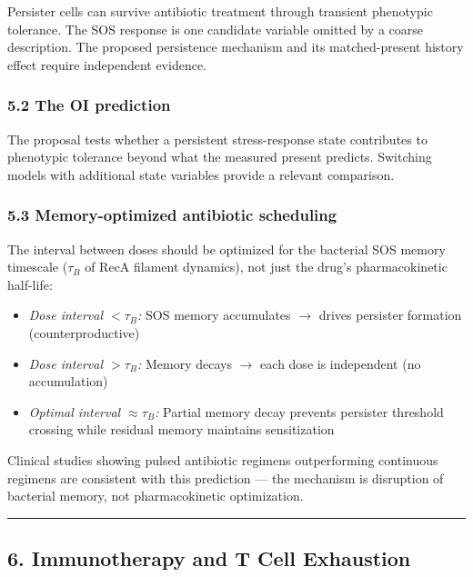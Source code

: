 \documentclass[
]{article}
\providecommand{\tightlist}{%
  \setlength{\itemsep}{0pt}\setlength{\parskip}{0pt}}
\begin{document}
Persister cells can survive antibiotic treatment through transient
phenotypic tolerance. The SOS response is one candidate variable omitted
by a coarse description. The proposed persistence mechanism and its
matched-present history effect require independent evidence.

\hypertarget{the-oi-prediction-1}{%
\subsubsection{5.2 The OI prediction}\label{the-oi-prediction-1}}

The proposal tests whether a persistent stress-response state
contributes to phenotypic tolerance beyond what the measured present
predicts. Switching models with additional state variables provide a
relevant comparison.

\hypertarget{memory-optimized-antibiotic-scheduling}{%
\subsubsection{5.3 Memory-optimized antibiotic
scheduling}\label{memory-optimized-antibiotic-scheduling}}

The interval between doses should be optimized for the bacterial SOS
memory timescale (\(\tau_B\) of RecA filament dynamics), not just the
drug's pharmacokinetic half-life:

\begin{itemize}
\tightlist
\item
  \emph{Dose interval \(< \tau_B\):} SOS memory accumulates \(\to\)
  drives persister formation (counterproductive)
\item
  \emph{Dose interval \(> \tau_B\):} Memory decays \(\to\) each dose is
  independent (no accumulation)
\item
  \emph{Optimal interval \(\approx \tau_B\):} Partial memory decay
  prevents persister threshold crossing while residual memory maintains
  sensitization
\end{itemize}

Clinical studies showing pulsed antibiotic regimens outperforming
continuous regimens are consistent with this prediction --- the
mechanism is disruption of bacterial memory, not pharmacokinetic
optimization.

\begin{center}\rule{0.5\linewidth}{0.5pt}\end{center}

\hypertarget{immunotherapy-and-t-cell-exhaustion}{%
\subsection{6. Immunotherapy and T Cell
Exhaustion}\label{immunotherapy-and-t-cell-exhaustion}}
\end{document}

